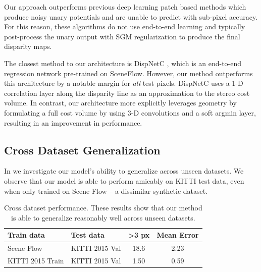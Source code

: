 Our approach outperforms previous deep learning patch based methods \citep{zbontar2015computing,luo2016efficient} which produce noisy unary potentials and are unable to predict with sub-pixel accuracy. For this reason, these algorithms do not use end-to-end learning and typically post-process the unary output with SGM regularization \citep{einecke2015multi} to produce the final disparity maps.

The closest method to our architecture is DispNetC \citep{MIFDB16}, which is an end-to-end regression network pre-trained on SceneFlow. However, our method outperforms this architecture by a notable margin for \textit{all} test pixels. DispNetC uses a 1-D correlation layer along the disparity line as an approximation to the stereo cost volume. In contrast, our architecture more explicitly leverages geometry by formulating a full cost volume by using 3-D convolutions and a soft argmin layer, resulting in an improvement in performance.

\subsection{Cross Dataset Generalization}
\label{sec:generalize}

In  we investigate our model's ability to generalize across unseen datasets. We observe that our model is able to perform amicably on KITTI test data, even when only trained on Scene Flow -- a dissimilar synthetic dataset.

\begin{table}[t]
\centering
\begin{tabular}{l|l|c|c}
Train data & Test data & \textgreater3 px & Mean Error \\ \hline \hline
Scene Flow & KITTI 2015 Val & 18.6 & 2.23 \\
KITTI 2015 Train & KITTI 2015 Val & 1.50 & 0.59 \\
\end{tabular}
	\caption[Cross dataset performance.]{Cross dataset performance. These results show that our method is able to generalize reasonably well across unseen datasets.}
	\label{tbl:generalize}
\end{table}

